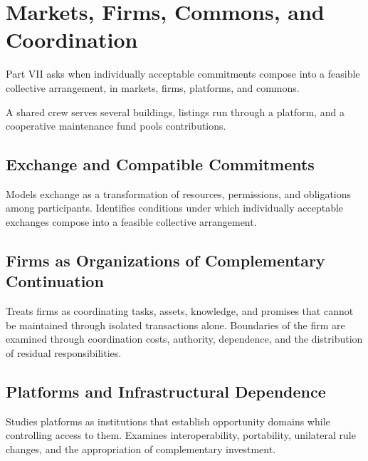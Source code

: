\part{Markets, Firms, Commons, and Coordination}
\label{part:VII}

Part VII asks when individually acceptable commitments compose into a feasible collective arrangement, in markets, firms, platforms, and commons.

\begin{housing}A shared crew serves several buildings, listings run through a platform, and a cooperative maintenance fund pools contributions.\end{housing}

\chapter{Exchange and Compatible Commitments}\label{ch:31}
Models exchange as a transformation of resources, permissions, and obligations among participants. Identifies conditions under which individually acceptable exchanges compose into a feasible collective arrangement.
\scaffold

\chapter{Firms as Organizations of Complementary Continuation}\label{ch:32}
Treats firms as coordinating tasks, assets, knowledge, and promises that cannot be maintained through isolated transactions alone. Boundaries of the firm are examined through coordination costs, authority, dependence, and the distribution of residual responsibilities.
\scaffold

\chapter{Platforms and Infrastructural Dependence}\label{ch:33}
Studies platforms as institutions that establish opportunity domains while controlling access to them. Examines interoperability, portability, unilateral rule changes, and the appropriation of complementary investment.
\scaffold


